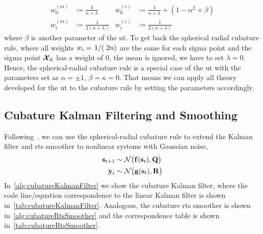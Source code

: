 		\begin{align*}
			w_0^{(m)} &\coloneqq \frac{\lambda}{n + \lambda} & w_0^{(c)} &\coloneqq \frac{\lambda}{n + \lambda} + (1 - \alpha^2 + \beta) \\
			w_i^{(m)} &\coloneqq \frac{1}{2(n + \lambda)}    & w_i^{(c)} &\coloneqq \frac{1}{2(n + \lambda)}
		\end{align*}
		where \(\beta\) is another parameter of the \ac{ut}. To get back the spherical radial cubature rule, where all weights \( w_i = \flatfrac{1}(2n) \) are the same for each sigma point and the sigma point \( \boldsymbol{\mathrm{\mathcal{X}}}_0 \) has a weight of \(0\), \ie the mean is ignored, we have to set \( \lambda = 0 \). Hence, the spherical-radial cubature rule is a special case of the \ac{ut} with the parameters set as \( \alpha = \pm 1 \), \( \beta = \kappa = 0 \). That means we can apply all theory developed for the \ac{ut} to the cubature rule by setting the parameters accordingly.

	\subsection{Cubature Kalman Filtering and Smoothing}
		\label{subsec:cubatureFiltering}

		Following~\cite{deisenrothProbabilisticPerspectiveGaussian2011,solinCubatureIntegrationMethods2010}, we can use the spherical-radial cubature rule to extend the Kalman filter and \ac{rts} smoother to nonlinear systems with Gaussian noise, \ie
		\begin{align*}
			\boldsymbol{\mathrm{s}}_{t + 1} &\sim \mathcal{N}\big( \boldsymbol{\mathrm{f}}(\boldsymbol{\mathrm{s}}_t), \boldsymbol{\mathrm{Q}} \big) \\
			\boldsymbol{\mathrm{y}}_t &\sim \mathcal{N}\big( \boldsymbol{\mathrm{g}}(\boldsymbol{\mathrm{s}}_t), \boldsymbol{\mathrm{R}} \big)
		\end{align*}
		In~\autoref{alg:cubatureKalmanFilter} we show the cubature Kalman filter, where the code line/equation correspondence to the linear Kalman filter is shown in~\autoref{tab:cubatureKalmanFilter}. Analogous, the cubature \ac{rts} smoother is shown in~\autoref{alg:cubatureRtsSmoother} and the correspondence table is shown in~\autoref{tab:cubatureRtsSmoother}.


